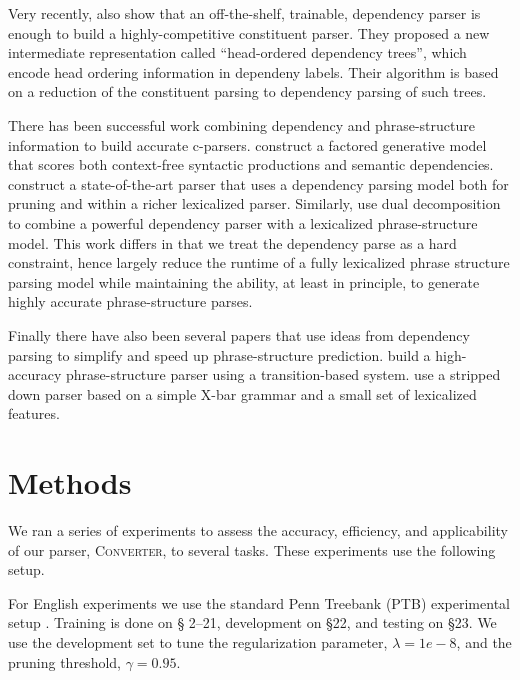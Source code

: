 \documentclass[11pt,letterpaper]{article}
\newcommand{\ParseName}{\textsc{Converter}\xspace}
\begin{document}
 Very recently,  also show that an off-the-shelf,
trainable, dependency parser is enough to build
a highly-competitive constituent parser. They proposed a new intermediate representation called ``head-ordered dependency trees'',
which encode head ordering information in dependeny labels. 
Their algorithm is based on a reduction of the constituent parsing to dependency parsing of such trees.



There has been successful work combining dependency and
phrase-structure information to build accurate c-parsers.
 construct a factored generative model that
scores both context-free syntactic productions and semantic
dependencies.   construct a state-of-the-art
parser that uses a dependency parsing model both for pruning and
within a richer lexicalized parser. Similarly, 
use dual decomposition to combine a powerful dependency parser with a
lexicalized phrase-structure model. This work differs in that we treat the
dependency parse as a hard constraint, hence largely reduce the
runtime of a fully lexicalized phrase structure parsing model
while maintaining the ability, at least in principle, to generate
highly accurate phrase-structure parses.




Finally there have also been several papers that use ideas from
dependency parsing to simplify and speed up phrase-structure prediction.
 build a high-accuracy phrase-structure parser
using a transition-based system.  use a stripped
down parser based on a simple X-bar grammar and a small set of lexicalized features.


\section{Methods}

We ran a series of experiments to assess the accuracy, efficiency,
and applicability of our parser, \ParseName, to several tasks. These experiments
use the following setup.  

For English experiments we use the standard Penn Treebank (PTB)
experimental setup \cite{marcus1993building}. Training is done on \S
2--21, development on \S 22, and testing on \S 23. We use the development set 
to tune the 
regularization parameter, $\lambda=1e-8$, and the pruning threshold, $\gamma=0.95$.
\end{document}
